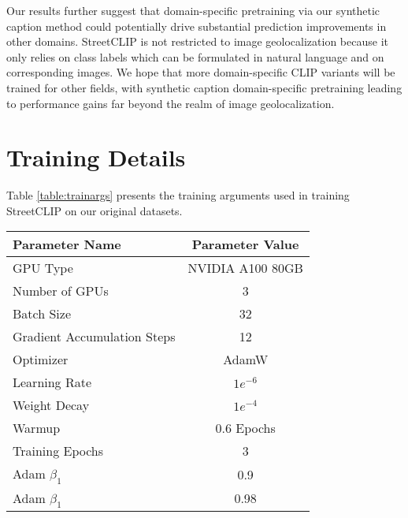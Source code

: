 \documentclass{article}
\begin{document}
Our results further suggest that domain-specific pretraining via our synthetic caption method could potentially drive substantial prediction improvements in other domains. StreetCLIP is not restricted to image geolocalization because it only relies on class labels which can be formulated in natural language and on corresponding images. We hope that more domain-specific CLIP variants will be trained for other fields, with synthetic caption domain-specific pretraining leading to performance gains far beyond the realm of image geolocalization.


  












\newpage
\appendix

\section{Training Details}
\label{app:training}

Table \ref{table:trainargs} presents the training arguments used in training StreetCLIP on our original datasets.

\begin{table*}[htb]
\caption{Domain-Specific Pretraining Parameters for StreetCLIP}
\label{table:trainargs}
\vskip 0.15in
\begin{center}
\begin{small}
\begin{sc}
\begin{tabular}{lc}
\toprule
\textbf{Parameter Name} & \textbf{Parameter Value} \\
\midrule
GPU Type & NVIDIA A100 80GB\\
Number of GPUs & 3\\
Batch Size & 32\\
Gradient Accumulation Steps & 12\\
Optimizer & AdamW\\
Learning Rate & $1e^{-6}$\\
Weight Decay & $1e^{-4}$\\
Warmup & 0.6 Epochs\\
Training Epochs & 3\\
Adam $\beta_1$ & 0.9\\
Adam $\beta_1$ & 0.98\\
\bottomrule
\end{tabular}
\end{sc}
\end{small}
\end{center}
\vskip -0.1in
\end{table*}
\end{document}
